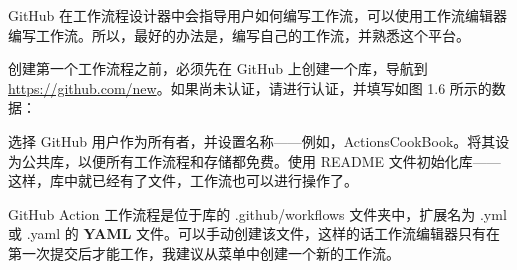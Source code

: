 
GitHub 在工作流程设计器中会指导用户如何编写工作流，可以使用工作流编辑器编写工作流。所以，最好的办法是，编写自己的工作流，并熟悉这个平台。


创建第一个工作流程之前，必须先在 GitHub 上创建一个库，导航到\url{https://github.com/new}。如果尚未认证，请进行认证，并填写如图 1.6 所示的数据：


选择 GitHub 用户作为所有者，并设置名称——例如，ActionsCookBook。将其设为公共库，以便所有工作流程和存储都免费。使用 README 文件初始化库——这样，库中就已经有了文件，工作流也可以进行操作了。


GitHub Action 工作流程是位于库的 .github/workflows 文件夹中，扩展名为 .yml 或 .yaml 的 \textbf{YAML} 文件。可以手动创建该文件，这样的话工作流编辑器只有在第一次提交后才能工作，我建议从菜单中创建一个新的工作流。

